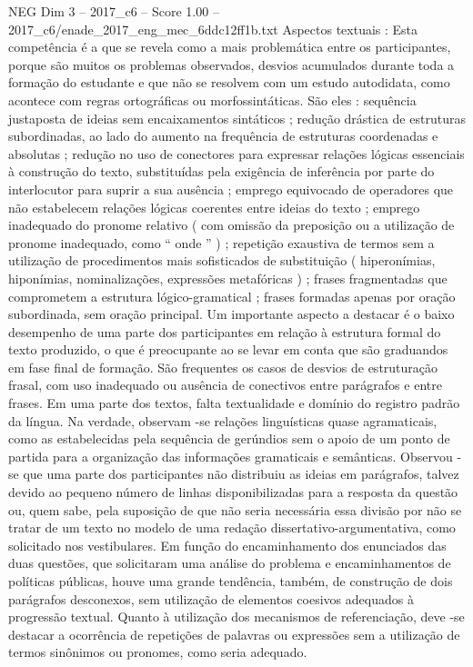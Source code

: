 \begin{textsample}{NEG Dim 3 – 2017\_c6 – Score 1.00 – 2017\_c6/enade\_2017\_eng\_mec\_6ddc12ff1b.txt}
Aspectos textuais : Esta competência é a que se revela como a mais problemática entre os participantes, porque são muitos os problemas observados, desvios acumulados durante toda a formação do estudante e que não se resolvem com um estudo autodidata, como acontece com regras ortográficas ou morfossintáticas.
São eles : sequência justaposta de ideias sem encaixamentos sintáticos ; redução drástica de estruturas subordinadas, ao lado do aumento na frequência de estruturas coordenadas e absolutas ; redução no uso de conectores para expressar relações lógicas essenciais à construção do texto, substituídas pela exigência de inferência por parte do interlocutor para suprir a sua ausência ; emprego equivocado de operadores que não estabelecem relações lógicas coerentes entre ideias do texto ; emprego inadequado do pronome relativo ( com omissão da preposição ou a utilização de pronome inadequado, como “ onde ” ) ; repetição exaustiva de termos sem a utilização de procedimentos mais sofisticados de substituição ( hiperonímias, hiponímias, nominalizações, expressões metafóricas ) ; frases fragmentadas que comprometem a estrutura lógico-gramatical ; frases formadas apenas por oração subordinada, sem oração principal.
Um importante aspecto a destacar é o baixo desempenho de uma parte dos participantes em relação à estrutura formal do texto produzido, o que é preocupante ao se levar em conta que são graduandos em fase final de formação.
São frequentes os casos de desvios de estruturação frasal, com uso inadequado ou ausência de conectivos entre parágrafos e entre frases.
Em uma parte dos textos, falta textualidade e domínio do registro padrão da língua.
Na verdade, observam -se relações linguísticas quase agramaticais, como as estabelecidas pela sequência de gerúndios sem o apoio de um ponto de partida para a organização das informações gramaticais e semânticas.
Observou -se que uma parte dos participantes não distribuiu as ideias em parágrafos, talvez devido ao pequeno número de linhas disponibilizadas para a resposta da questão ou, quem sabe, pela suposição de que não seria necessária essa divisão por não se tratar de um texto no modelo de uma redação dissertativo-argumentativa, como solicitado nos vestibulares.
Em função do encaminhamento dos enunciados das duas questões, que solicitaram uma análise do problema e encaminhamentos de políticas públicas, houve uma grande tendência, também, de construção de dois parágrafos desconexos, sem utilização de elementos coesivos adequados à progressão textual.
Quanto à utilização dos mecanismos de referenciação, deve -se destacar a ocorrência de repetições de palavras ou expressões sem a utilização de termos sinônimos ou pronomes, como seria adequado.

\end{textsample}

